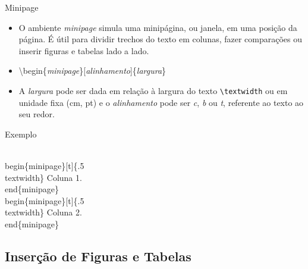 \begin{frame}[fragile]{Minipage}
    \begin{itemize}
    \item O ambiente \textit{minipage} simula uma minipágina, ou janela, em uma posição da página. É útil para dividir trechos do texto em colunas, fazer comparações ou inserir figuras e tabelas lado a lado.
    \item[] \alert{\textbackslash begin\{\textit{minipage}\}[\textit{alinhamento}]\{\textit{largura}\}}
    \item A \textit{largura} pode ser dada em relação à largura do texto \verb|\textwidth| ou em unidade fixa (cm, pt) e o \textit{alinhamento} pode ser \textit{c}, \textit{b} ou \textit{t}, referente ao texto ao seu redor.
    \end{itemize}

    \begin{exampleblock}{Exemplo}
\begin{semiverbatim}\footnotesize
    \\begin\{minipage\}[t]\{.5\\textwidth\}
        Coluna 1.
    \\end\{minipage\}
    \\begin\{minipage\}[t]\{.5\\textwidth\}
        Coluna 2.
    \\end\{minipage\}
\end{semiverbatim}
    \end{exampleblock}
\end{frame}

\subsection{Inserção de Figuras e Tabelas}

